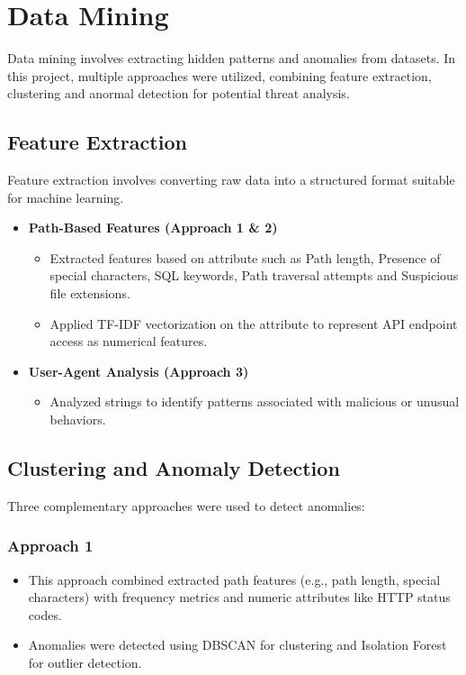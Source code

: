 \section{Data Mining}
Data mining involves extracting hidden patterns and anomalies from datasets. In this project, multiple approaches were utilized, combining feature extraction, clustering and anormal detection for potential threat analysis.

\subsection{Feature Extraction}
Feature extraction involves converting raw data into a structured format suitable for machine learning.
\begin{itemize}
	\item \textbf{Path-Based Features (Approach 1 \& 2)}
	\begin{itemize}
		\item Extracted features based on  attribute such as Path length, Presence of special characters, SQL keywords, Path traversal attempts and Suspicious file extensions.
		\item Applied TF-IDF vectorization on the  attribute to represent API endpoint access as numerical features.
	\end{itemize}
	\item \textbf{User-Agent Analysis (Approach 3)}
	\begin{itemize}
		\item Analyzed  strings to identify patterns associated with malicious or unusual behaviors.
	\end{itemize}
\end{itemize}

\subsection{Clustering and Anomaly Detection}
Three complementary approaches were used to detect anomalies:
\subsubsection{Approach 1}
\begin{itemize}
	\item This approach combined extracted path features (e.g., path length, special characters) with frequency metrics and numeric attributes like HTTP status codes.
	\item Anomalies were detected using DBSCAN for clustering and Isolation Forest for outlier detection.
\end{itemize}
